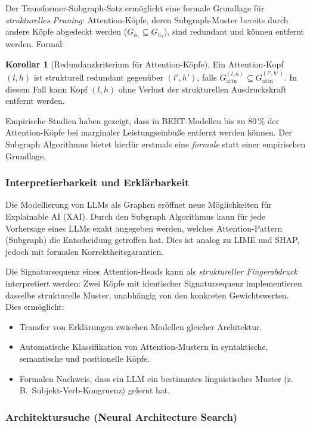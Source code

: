 ﻿\documentclass[a4paper,12pt]{article}
\theoremstyle{definition}
\newtheorem{korollar}{Korollar}
\begin{document}
Der Transformer-Subgraph-Satz ermöglicht eine formale Grundlage für
\textit{strukturelles Pruning}: Attention-Köpfe, deren Subgraph-Muster
bereits durch andere Köpfe abgedeckt werden ($G_{h_1} \subseteq G_{h_2}$),
sind redundant und können entfernt werden. Formal:

\begin{korollar}[Redundanzkriterium für Attention-Köpfe]
	Ein Attention-Kopf $(l, h)$ ist strukturell redundant gegenüber
	$(l', h')$, falls $G_{\mathrm{attn}}^{(l,h)} \subseteq G_{\mathrm{attn}}^{(l',h')}$.
	In diesem Fall kann Kopf $(l, h)$ ohne Verlust der strukturellen
	Ausdruckskraft entfernt werden.
\end{korollar}

Empirische Studien \cite{voita2019analyzing} haben gezeigt, dass in
BERT-Modellen bis zu 80\,\% der Attention-Köpfe bei marginaler Leistungseinbuße
entfernt werden können. Der Subgraph Algorithmus bietet hierfür erstmals
eine \textit{formale} statt einer empirischen Grundlage.

\subsubsection{Interpretierbarkeit und Erklärbarkeit}

Die Modellierung von LLMs als Graphen eröffnet neue Möglichkeiten für
Explainable AI (XAI). Durch den Subgraph Algorithmus kann für jede
Vorhersage eines LLMs exakt angegeben werden, welches Attention-Pattern
(Subgraph) die Entscheidung getroffen hat. Dies ist analog zu LIME
\cite{ribeiro2016} und SHAP, jedoch mit formalen Korrektheitsgarantien.

Die Signatursequenz eines Attention-Heads kann als \textit{struktureller
Fingerabdruck} interpretiert werden: Zwei Köpfe mit identischer Signatursequenz
implementieren dasselbe strukturelle Muster, unabhängig von den konkreten
Gewichtswerten. Dies ermöglicht:
\begin{itemize}
	\item Transfer von Erklärungen zwischen Modellen gleicher Architektur.
	\item Automatische Klassifikation von Attention-Mustern in syntaktische,
	      semantische und positionelle Köpfe.
	\item Formalen Nachweis, dass ein LLM ein bestimmtes linguistisches
	      Muster (z.\,B.\ Subjekt-Verb-Kongruenz) gelernt hat.
\end{itemize}

\subsubsection{Architektursuche (Neural Architecture Search)}
\end{document}
